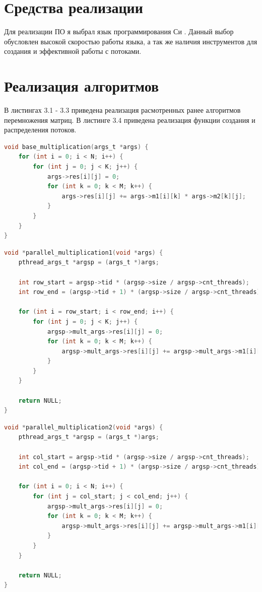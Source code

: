 \documentclass[12pt]{report}
\begin{document}
\section{Средства реализации}
Для реализации ПО я выбрал язык программирования Си \cite{C}. Данный выбор обусловлен высокой скоростью работы языка, а так же наличия инструментов для создания и эффективной работы с потоками.

\section{Реализация алгоритмов}

В листингах 3.1 - 3.3 приведена реализация расмотренных ранее алгоритмов перемножения матриц.
В листинге 3.4 приведена реализация функции создания и распределения потоков.

\begin{lstlisting}[label=some-code,caption=Функция умножения матриц обычным способом, language=C]
void base_multiplication(args_t *args) {
	for (int i = 0; i < N; i++) {
		for (int j = 0; j < K; j++) {
			args->res[i][j] = 0;
			for (int k = 0; k < M; k++) {
				args->res[i][j] += args->m1[i][k] * args->m2[k][j];
			}
		}
	}
}
\end{lstlisting}

\begin{lstlisting}[label=some-code,caption=Функция умножения матриц параллельно. Способ №1,language=C]
void *parallel_multiplication1(void *args) {
	pthread_args_t *argsp = (args_t *)args;

	int row_start = argsp->tid * (argsp->size / argsp->cnt_threads);
	int row_end = (argsp->tid + 1) * (argsp->size / argsp->cnt_threads);

	for (int i = row_start; i < row_end; i++) {
		for (int j = 0; j < K; j++) {
			argsp->mult_args->res[i][j] = 0;
			for (int k = 0; k < M; k++) {
				argsp->mult_args->res[i][j] += argsp->mult_args->m1[i][k] * argsp->mult_args->m2[k][j];
			}
		}
	}

	return NULL;
}

\end{lstlisting}

\begin{lstlisting}[label=some-code,caption=Функция умножения матриц параллельно. Способ №2,language=C]
void *parallel_multiplication2(void *args) {
	pthread_args_t *argsp = (args_t *)args;

	int col_start = argsp->tid * (argsp->size / argsp->cnt_threads);
	int col_end = (argsp->tid + 1) * (argsp->size / argsp->cnt_threads);

	for (int i = 0; i < N; i++) {
		for (int j = col_start; j < col_end; j++) {
			argsp->mult_args->res[i][j] = 0;
			for (int k = 0; k < M; k++) {
				argsp->mult_args->res[i][j] += argsp->mult_args->m1[i][k] * argsp->mult_args->m2[k][j];
			}
		}
	}

	return NULL;
}
\end{lstlisting}
\end{document}
